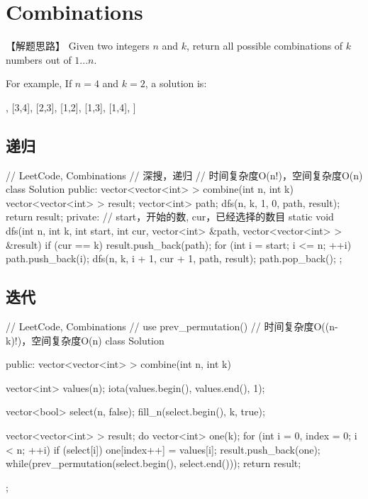 \section{Combinations} %
\label{sec:combinations}


【解题思路】
Given two integers $n$ and $k$, return all possible combinations of $k$ numbers out of $1 ... n$.

For example,
If $n = 4$ and $k = 2$, a solution is:
\begin{Code}
	[
	[2,4],
	[3,4],
	[2,3],
	[1,2],
	[1,3],
	[1,4],
	]
\end{Code}


\subsection{递归}
\begin{Code}
	// LeetCode, Combinations
	// 深搜，递归
	// 时间复杂度O(n!)，空间复杂度O(n)
	class Solution {
		public:
		vector<vector<int> > combine(int n, int k) {
			vector<vector<int> > result;
			vector<int> path;
			dfs(n, k, 1, 0, path, result);
			return result;
		}
		private:
		// start，开始的数, cur，已经选择的数目
		static void dfs(int n, int k, int start, int cur,
		vector<int> &path, vector<vector<int> > &result) {
			if (cur == k) {
				result.push_back(path);
			}
			for (int i = start; i <= n; ++i) {
				path.push_back(i);
				dfs(n, k, i + 1, cur + 1, path, result);
				path.pop_back();
			}
		}
	};
\end{Code}


\subsection{迭代}
\begin{Code}
	// LeetCode, Combinations
	// use prev_permutation()
	// 时间复杂度O((n-k)!)，空间复杂度O(n)
	class Solution {
		public:
		vector<vector<int> > combine(int n, int k) {
			vector<int> values(n);
			iota(values.begin(), values.end(), 1);
			
			vector<bool> select(n, false);
			fill_n(select.begin(), k, true);
			
			vector<vector<int> > result;
			do{
				vector<int> one(k);
				for (int i = 0, index = 0; i < n; ++i)
				if (select[i])
				one[index++] = values[i];
				result.push_back(one);
			} while(prev_permutation(select.begin(), select.end()));
			return result;
		}
	};
\end{Code}


